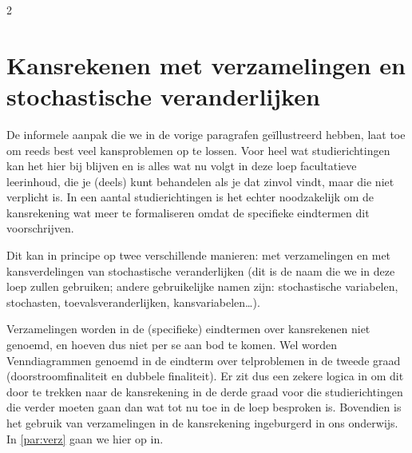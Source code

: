 \begin{multicols}{2}
\begin{afbeeldingenv}
\caption{Kansboom rhesusfactor en bloedgroepen}
\label{fig:bloed_versie02}
\end{afbeeldingenv}




\section{Kansrekenen met verzamelingen en stochastische veranderlijken}

De informele aanpak die we in de vorige paragrafen geïllustreerd hebben, laat toe om reeds best veel kansproblemen op te lossen. Voor heel wat studierichtingen kan het hier bij blijven en is alles wat nu volgt in deze loep facultatieve leerinhoud, die je (deels) kunt behandelen als je dat zinvol vindt, maar die niet verplicht is. In een aantal studierichtingen is het echter noodzakelijk om de kansrekening wat meer te formaliseren omdat de specifieke eindtermen dit voorschrijven.

Dit kan in principe op twee verschillende manieren: met verzamelingen en met kansverdelingen van stochastische veranderlijken (dit is de naam die we in deze loep zullen gebruiken; andere gebruikelijke namen zijn: stochastische variabelen, stochasten, toevalsveranderlijken, kansvariabelen…).

Verzamelingen worden in de (specifieke) eindtermen over kansrekenen niet genoemd, en hoeven dus niet per se aan bod te komen. Wel worden Venndiagrammen genoemd in de eindterm over telproblemen in de tweede graad (doorstroomfinaliteit en dubbele finaliteit). Er zit dus een zekere logica in om dit door te trekken naar de kansrekening in de derde graad voor die studierichtingen die verder moeten gaan dan wat tot nu toe in de loep besproken is. Bovendien is het gebruik van verzamelingen in de kansrekening ingeburgerd in ons onderwijs. In \autoref{par:verz} gaan we hier op in.


\end{multicols}
